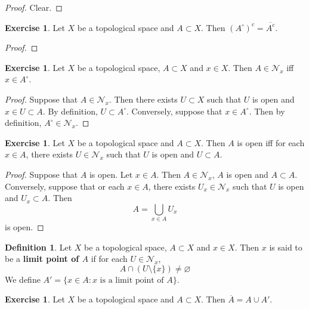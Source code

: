 \documentclass[12pt]{amsart}
\theoremstyle{definition}
\newtheorem{defn}[definition]{Definition}
\newtheorem{ex}[definition]{Exercise}
\newcommand{\MN}{\mathcal{N}}
\newcommand{\lex}[1]{\label{ex:#1}}
\newcommand{\ld}[1]{\label{defn:#1}}
\begin{document}
	\begin{proof}
	Clear.
	\end{proof}
	
	\begin{ex} \lex{31015}
	Let $X$ be a topological space and $A \subset X$. Then $(A^{\circ})^c = \overline{A^c}$.
	\end{ex}	
	
	\begin{proof}
	
	\end{proof}
	
	
	\begin{ex} \lex{31016}
	Let $X$ be a topological space, $A \subset X$ and $x \in X$. Then $A \in \MN_x$ iff $x \in A^{\circ}$.
	\end{ex}
	
	\begin{proof}
	Suppose that $A \in \MN_x$. Then there exists $U \subset X$ such that $U$ is open and $x \in U \subset A$. By definition, $U \subset A^{\circ}$. Conversely, suppose that $x \in A^{\circ}$. Then by definition, $A^{\circ} \in \MN_x$.
	\end{proof}
	
	\begin{ex} \lex{31017}
	Let $X$ be a topological space and $A \subset X$. Then $A$ is open iff for each $x \in A$, there exists $U \in \MN_x$ such that $U$ is open and $U \subset A$.
	\end{ex}
	
	\begin{proof}
	Suppose that $A$ is open. Let $x \in A$. Then $A \in \MN_x$, $A$ is open and $A \subset A$. Conversely, suppose that or each $x \in A$, there exists $U_x \in \MN_x$ such that $U$ is open and $U_x \subset A$. Then $$A = \bigcup\limits_{x \in A}U_x$$ is open. 
	\end{proof}
	
	\begin{defn} \ld{31018}
	Let $X$ be a topological space, $A \subset X$ and $x \in X$. Then $x$ is said to be a \textbf{limit point of $A$} if for each $U \in \MN_x$, $$A \cap (U \setminus \{x\}) \neq \varnothing$$  
	We define $A' = \{x \in A: \text{$x$ is a limit point of $A$}\}$.
	\end{defn}
	
	\begin{ex} \lex{31019}
	Let $X$ be a topological space and $A \subset X$. Then $\overline{A} = A \cup A'$. 
	\end{ex}	
	
\end{document}
